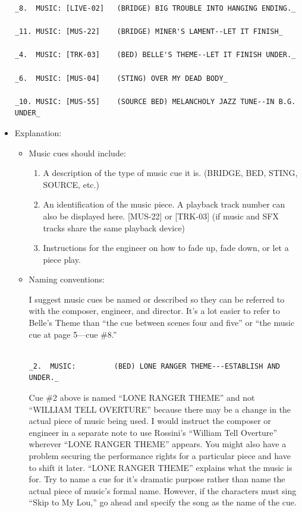 \documentclass[openleft,oneside,showtrims]{memoir}
\begin{document}
\begin{itemize}
\begin{lstlisting}
_8.  MUSIC: [LIVE-02]   (BRIDGE) BIG TROUBLE INTO HANGING ENDING._

_11. MUSIC: [MUS-22]    (BRIDGE) MINER'S LAMENT--LET IT FINISH_

_4.  MUSIC: [TRK-03]    (BED) BELLE'S THEME--LET IT FINISH UNDER._

_6.  MUSIC: [MUS-04]    (STING) OVER MY DEAD BODY_

_10. MUSIC: [MUS-55]    (SOURCE BED) MELANCHOLY JAZZ TUNE--IN B.G. UNDER_

\end{lstlisting}

\item Explanation:
\label{sec:org0f3c1a2}

\begin{itemize}
\item Music cues should include:
\label{sec:org7b5eb11}

\begin{enumerate}
\item A description of the type of music cue it is. (BRIDGE, BED, STING, SOURCE, etc.)

\item An identification of the music piece. A playback track number can also be displayed here. [MUS-22] or [TRK-03] (if music and SFX tracks share the same playback device)

\item Instructions for the engineer on how to fade up, fade down, or let a piece play.
\end{enumerate}

\item Naming conventions:  
\label{sec:orgf04ce92}

I suggest music cues be named or described so they can be referred to with the composer, engineer, and director. It's a lot easier to refer to Belle's Theme than ``the cue between scenes four and five'' or ``the music cue at page 5—cue \#8.''

\lstset{language=fountain,label= ,caption= ,captionpos=b,numbers=none}
\begin{lstlisting}

_2.  MUSIC:         (BED) LONE RANGER THEME---ESTABLISH AND UNDER._

\end{lstlisting}

Cue \#2 above is named ``LONE RANGER THEME'' and not ``WILLIAM TELL OVERTURE'' because there may be a change in the actual piece of music being used. I would instruct the composer or engineer in a separate note to use Rossini's ``William Tell Overture'' wherever ``LONE RANGER THEME'' appears. You might also have a problem securing the performance rights for a particular piece and have to shift it later. ``LONE RANGER THEME'' explains what the music is for. Try to name a cue for it's dramatic purpose rather than name the actual piece of music's formal name. However, if the characters must sing ``Skip to My Lou,'' go ahead and specify the song as the name of the cue.


\end{itemize}
\end{itemize}
\end{document}
